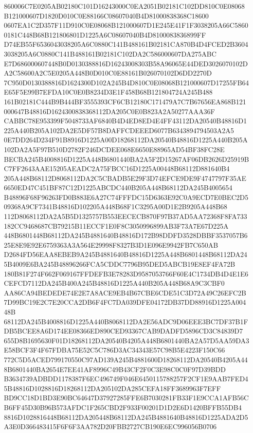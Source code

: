\documentclass[UTF8,fontset=fandol,zihao=-4,a4paper]{ctexart}
\begin{document}
{{860006C7E0205AB02180C101D16243000C0EA2051B02181C102DD810C0E08068B121000607D1820D010C0E88166C08607040B4D81000838368C18600
0607EA1C2D357F11D910C0E08068B121000607D1E245E41F1F3038205A66C58600181C448B68B121806801D1225A6C08607040B4D8100083836899FF
D74EB55F6536043038205A6C0880C141B488161B02181CA870B4D4FCED2B36043038205A6C0880C141B488161B02181C102DA2C586000607DA275ABC
E7D686000607448B0D0130388816D16243008303B58A96065E44DED3026070102DA2C58600A2C5E0205A448B0D010C0E88161B026070102D6DD2270D
7C950D0130388816D1624300D102A245B4D810C0E08068B121000607D17255FB64E65F5E99B7EFDA10C0E0B8234D3E1F458B68B121804724A245B488
161B02181C444B9B444BF3555393CF6CB12180C171479A7C7B67656EA868B121000647B48816D1624300838368112DA205C0E0B823A2A50277AAA36F
CABBC78E953399F5048733AF6840B4D4ED8ED4E4FF43112DA20540B48816D1225A440B205A102DA2E5DF57B8DAFFCDEEED6077B6343894794503A2A5
0E7DD264D234F91B8916D1225A00D18268112DA20540B48816D1225A440B205A102DA2A5F97B510D2782F246DCDEE068E6650E88965AD54BF38FC28E
BECBA245B4008816D1225A448B6801440BA2A5F2D15267AF06DB2626D25919BC7FF2643AAE15205AEADC2A75FBCC16D1225A00448B68112D881640B4
205A448B68112D8068112DA2C5CBADB5E29F3D74EFCE9DE9F4747797F35AE6650ED47C451BF87C12D1225ABCDC440B205A448B68112DA245B4005654
B48896F68F96263FD0B883E6A27C74FFFDC15D6363E92C0A9ECD7E0BEC2D509368A9CF7341B48816D102205A448B68F1C3295A00D1E2B9205A448B68
112D8068112DA2A5B5D1325757B553EECECB870F97B37AD5AA72368F8FA733182CC9468687CB79215B11ECCF1E0F8C3050996899AB3F73A7E67D225A
448B6801448B68112DA245B4881640B48816D172B98DDFD3528DBBF3537057B625E8E9E92E6759363A3A564E29998F8327B3D1E096E9942FB7C650AB
D2684FD56EAA8EBEB9A245B4881640B48816D1225A448B6801448B68112DA245B4009E6BA245B48896266FCA5CDDC7796B95DED5ABCB19E8EF4FA72B
180B81F274F662F069167FFDEFB3E78283D9587053766F60E4C1734DB4D4E1E6CEFCD7112DA245B400A245B48816D1225A440B205A448B68A9C3CBF0
AA86CA94BEDEDE74E2E7A8ACE9EB4B67CBE6CDE51C3D72A49C26EFC2B7D99BC19E2C7E20CCA2DB6F4FC7DA039DFE04172DB37DD88916D1225A00448B
68112DA245B4008816D1225A440B8068112DA2E56ADC9D06EEE3BC7DF37B1FDB5BCEE8A6D174EE08366ED890CED93367CAB9DADFD5896CD3C84839D7
655D8B1695630F01D18268112DA20540B4205A448B6801440BA2A57D5AA59DA3E58BCF3F4F67FDBA75E52C5C786D3AC34343E57C98B5E4223F150C66
772C5D5ACED799170550C97AD139A245B4881600D18268112DA20540B4205A448B6801440BA2654E7EE41AF8996C49B43CF2F0C3E98C0C0F97D39BDD
B3634739ADBDD1178387F6EC496749F046E6450115788257F2CF1E9AAB7FED45B48816D1028816D18268112DA205102DA285CEFA18FF3689963F7EFF
BD9CC18D1BD3E90BC64647D37927285FFE6B7030281FB33F1E9CCA1AFB56CB6FF45D30B96B573AFDC1F265CBD2F933F00201D1D2E6D1420BFFB55DB4
8816D1028816448B68112DA205448B68112DA245B4881640B48816D1225ADA2D5A3E0D366483415F6F6F3AA782D20FBB2727CB190E6EC996056B0706
}}
\end{document}
